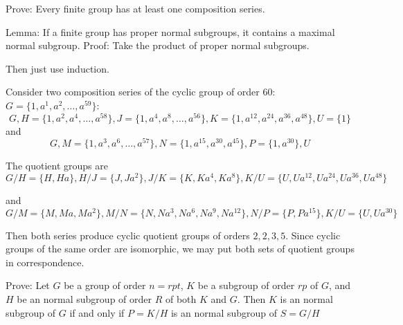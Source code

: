 \exercise
Prove: Every finite group has at least one composition series.

\answer
Lemma: If a finite group has proper normal subgroups, it contains a maximal normal subgroup. Proof: Take the product of proper normal subgroups.

Then just use induction.


\exercise
Consider two composition series of the cyclic group of order $60$: $G = \{1, a^1, a^2, \ldots, a^{59}\}$:
\[G, 
H = \{1,a^2, a^4, \ldots, a^{58}\}, 
J=\{1, a^4, a^8, \ldots, a^{56}\}, 
K = \{1, a^{12}, a^{24}, a^{36}, a^{48}\}, 
U = \{1\}\]
and
\[G,
    M = \{1, a^3, a^6, \ldots, a^{57}\},
N = \{1, a^{15}, a^{30}, a^{45}\},
P = \{1, a^{30}\},
U\]

\answer
The quotient groups are 
\[G/H = \{H, Ha\},
H/J = \{J, Ja^2\},
J/K = \{K, Ka^4, Ka^8\},
K/U = \{U, Ua^{12}, Ua^{24}, Ua^{36}, Ua^{48}\}\]

and
\[G/M = \{M, Ma, Ma^2\},
M/N = \{N, Na^3, Na^6, Na^9, Na^{12}\},
N/P = \{P, Pa^{15}\},
K/U = \{U, Ua^{30}\}\]

Then both series produce cyclic quotient groups of orders $2, 2, 3, 5$. Since cyclic groups of the same order are isomorphic, we may put both sets of quotient groups in correspondence.


\exercise
Prove: Let $G$ be a group of order $n = rpt$, $K$ be a subgroup of order $rp$ of $G$, and $H$ be an normal subgroup of order $R$ of both $K$ and $G$. Then $K$ is an normal subgroup of $G$ if and only if $P = K/H$ is an normal subgroup of $S = G/H$
